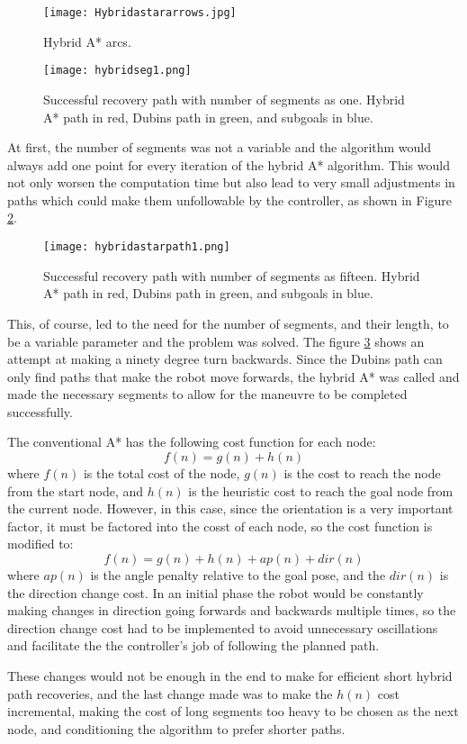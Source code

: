 \begin{figure}[h]
    \centering
    \texttt{[image: Hybridastararrows.jpg]}
    \caption{Hybrid A* arcs.}
    \label{fig:arrows}
\end{figure}

\begin{figure}[h]
    \centering
    \texttt{[image: hybridseg1.png]}
    \caption{Successful recovery path with number of segments as one. Hybrid A* path in red, Dubins path in green, and subgoals in blue.}
    \label{fig:rseg1}
\end{figure}

At first, the number of segments was not a variable and the algorithm would always add 
one point for every iteration of the hybrid A* algorithm. This would not only worsen the computation 
time but also lead to very small adjustments in paths which could make them unfollowable by the controller, 
as shown in Figure \ref{fig:rseg1}.



\begin{figure}[h]
    \centering
    \texttt{[image: hybridastarpath1.png]}
    \caption{Successful recovery path with number of segments as fifteen. Hybrid A* path in red, Dubins path in green, and subgoals in blue.}
    \label{fig:recovery_module}
\end{figure}

This, of course, led to the need for the number of segments, and their length, to be a variable 
parameter and the problem was solved. The figure \ref{fig:recovery_module} shows an attempt at 
making a ninety degree turn backwards. Since the Dubins path can only find paths that make the robot move 
forwards, the hybrid A* was called and made the necessary segments to allow for the maneuvre 
to be completed successfully.

The conventional A* has the following cost function for each node:
$$f(n) = g(n) + h(n)$$
where $f(n)$ is the total cost of the node, $g(n)$ is the cost to reach the node from the start node, 
and $h(n)$ is the heuristic cost to reach the goal node from the current node. However, 
in this case, since the orientation is a very important factor, it must be factored 
into the cosst of each node, so the cost function is modified to:
$$f(n) = g(n) + h(n) + ap(n) + dir(n)$$
where $ap(n)$ is the angle penalty relative to the goal pose, and the $dir(n)$ 
is the direction change cost. In an initial phase the robot would be constantly making 
changes in direction going forwards and backwards multiple times, so the direction 
change cost had to be implemented to avoid unnecessary oscillations and facilitate the 
the controller's job of following the planned path.

These changes would not be enough in the end to make for efficient short hybrid path recoveries, 
and the last change made was to make the $h(n)$ cost incremental, making the cost 
of long segments too heavy to be chosen as the next node, and conditioning the 
algorithm to prefer shorter paths.

